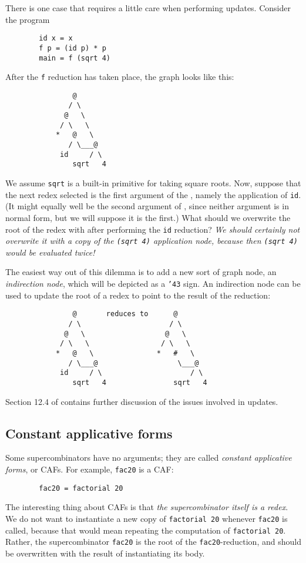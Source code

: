 There is one case that requires a little care when performing updates.
Consider the program
\begin{verbatim}
        id x = x
        f p = (id p) * p
        main = f (sqrt 4)
\end{verbatim}
After the \mbox{\tt f} reduction has taken place, the graph looks like this:
\begin{verbatim}
                @
               / \
              @   \
             / \   \
            *   @   \
               / \___@
             id     / \
                sqrt   4
\end{verbatim}
We assume \mbox{\tt sqrt} is a built-in primitive for taking square roots.
Now, suppose that the next redex selected is the first argument of the \mbox{\tt *},
namely the application of \mbox{\tt id}.
(It might equally well be the second argument of \mbox{\tt *}, since neither argument
is in normal form, but we will suppose it is the first.)
What should we overwrite the root of the redex with after performing the
\mbox{\tt id} reduction?  {\em We should certainly not overwrite it with a
copy of the \mbox{\tt (sqrt\ 4)} application node,
because then \mbox{\tt (sqrt\ 4)} would be evaluated twice!}

The easiest way out of this dilemma is to add a new sort of graph node,
an {\em indirection node}\index{indirections},
which will be depicted as a \mbox{\tt {\char'43}} sign.  An
indirection node can be used to update the root of a redex to point to
the result of the reduction:
\begin{verbatim}
                @       reduces to      @
               / \                     / \
              @   \                   @   \
             / \   \                 / \   \
            *   @   \               *   #   \
               / \___@                   \___@
             id     / \                     / \
                sqrt   4                sqrt   4
\end{verbatim}
Section 12.4 of \cite{PJBook} contains further discussion of the
issues involved in updates.

\subsection{Constant applicative forms\advanced}
\label{sect:caf}

Some supercombinators have no arguments; they are called {\em constant
applicative forms}, or CAFs.
\index{CAF}
For example, \mbox{\tt fac20} is a CAF:
\begin{verbatim}
        fac20 = factorial 20
\end{verbatim}
The interesting thing about CAFs is that {\em the supercombinator itself
is a redex}.  We do not want to instantiate a new copy of \mbox{\tt factorial\ 20}
whenever \mbox{\tt fac20} is called, because that would mean repeating the
computation of \mbox{\tt factorial\ 20}.  Rather, the supercombinator \mbox{\tt fac20} is
the root of the \mbox{\tt fac20}-reduction, and should be overwritten with the
result of instantiating its body.

